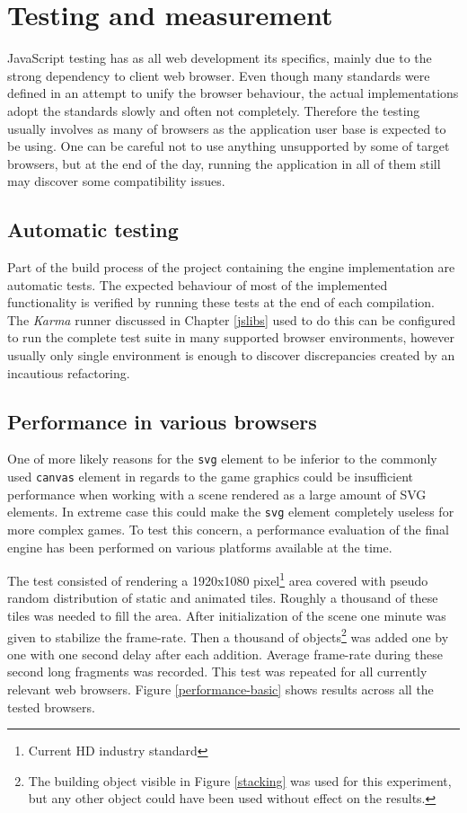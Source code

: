 \documentclass[11pt,oneside, final]{fithesis2}
\begin{document}
\chapter{Testing and measurement}
\label{testing}
JavaScript testing has as all web development its specifics, mainly due to the strong dependency to client web browser. Even though many standards were defined in an attempt to unify the browser behaviour, the actual implementations adopt the standards slowly and often not completely. Therefore the testing usually involves as many of browsers as the application user base is expected to be using. One can be careful not to use anything unsupported by some of target browsers, but at the end of the day, running the application in all of them still may discover some compatibility issues.

\section{Automatic testing}
Part of the build process of the project containing the engine implementation are automatic tests. The expected behaviour of most of the implemented functionality is verified by running these tests at the end of each compilation. The \emph{Karma} runner discussed in Chapter \ref{jslibs} used to do this can be configured to run the complete test suite in many supported browser environments, however usually only single environment is enough to discover discrepancies  created by an incautious refactoring.

\section{Performance in various browsers}
One of more likely reasons for the \texttt{svg} element to be inferior to the commonly used \texttt{canvas} element in regards to the game graphics could be insufficient performance when working with a scene rendered as a large amount of SVG elements. In extreme case this could make the \texttt{svg} element completely useless for more complex games. To test this concern, a performance evaluation of the final engine has been performed on various platforms available at the time.

The test consisted of rendering a 1920x1080 pixel\footnote{Current HD industry standard} area covered with pseudo random distribution of static and animated tiles. Roughly a thousand of these tiles was needed to fill the area. After initialization of the scene one minute was given to stabilize the frame-rate. Then a thousand of objects\footnote{The building object visible in Figure \ref{stacking} was used for this experiment, but any other object could have been used without effect on the results.} was added one by one with one second delay after each addition. Average frame-rate during these second long fragments was recorded. This test was repeated for all currently relevant web browsers. Figure \ref{performance-basic} shows results across all the tested browsers.
\end{document}
